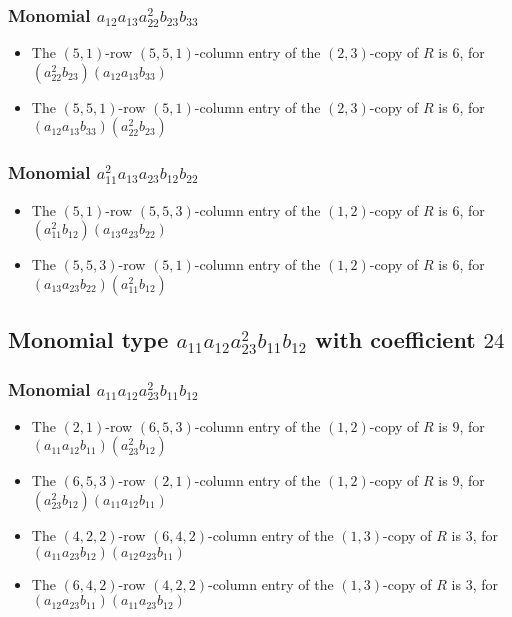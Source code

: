 \documentclass{article}
\begin{document}
\subsubsection{Monomial $ a_{12} a_{13} a_{22}^{2} b_{23} b_{33} $}

\begin{itemize}
\item The $(5, 1)$-row $(5, 5, 1)$-column entry of the $ \left(2, 3\right) $-copy of $R$ is $ 6 $, for $( a_{22}^{2} b_{23} )( a_{12} a_{13} b_{33} )$ 
\item The $(5, 5, 1)$-row $(5, 1)$-column entry of the $ \left(2, 3\right) $-copy of $R$ is $ 6 $, for $( a_{12} a_{13} b_{33} )( a_{22}^{2} b_{23} )$ 
\end{itemize}
\subsubsection{Monomial $ a_{11}^{2} a_{13} a_{23} b_{12} b_{22} $}

\begin{itemize}
\item The $(5, 1)$-row $(5, 5, 3)$-column entry of the $ \left(1, 2\right) $-copy of $R$ is $ 6 $, for $( a_{11}^{2} b_{12} )( a_{13} a_{23} b_{22} )$ 
\item The $(5, 5, 3)$-row $(5, 1)$-column entry of the $ \left(1, 2\right) $-copy of $R$ is $ 6 $, for $( a_{13} a_{23} b_{22} )( a_{11}^{2} b_{12} )$ 
\end{itemize}
\subsection{Monomial type $ a_{11} a_{12} a_{23}^{2} b_{11} b_{12} $ with coefficient $ 24 $}

\subsubsection{Monomial $ a_{11} a_{12} a_{23}^{2} b_{11} b_{12} $}

\begin{itemize}
\item The $(2, 1)$-row $(6, 5, 3)$-column entry of the $ \left(1, 2\right) $-copy of $R$ is $ 9 $, for $( a_{11} a_{12} b_{11} )( a_{23}^{2} b_{12} )$ 
\item The $(6, 5, 3)$-row $(2, 1)$-column entry of the $ \left(1, 2\right) $-copy of $R$ is $ 9 $, for $( a_{23}^{2} b_{12} )( a_{11} a_{12} b_{11} )$ 
\item The $(4, 2, 2)$-row $(6, 4, 2)$-column entry of the $ \left(1, 3\right) $-copy of $R$ is $ 3 $, for $( a_{11} a_{23} b_{12} )( a_{12} a_{23} b_{11} )$ 
\item The $(6, 4, 2)$-row $(4, 2, 2)$-column entry of the $ \left(1, 3\right) $-copy of $R$ is $ 3 $, for $( a_{12} a_{23} b_{11} )( a_{11} a_{23} b_{12} )$ 
\end{itemize}
\end{document}
